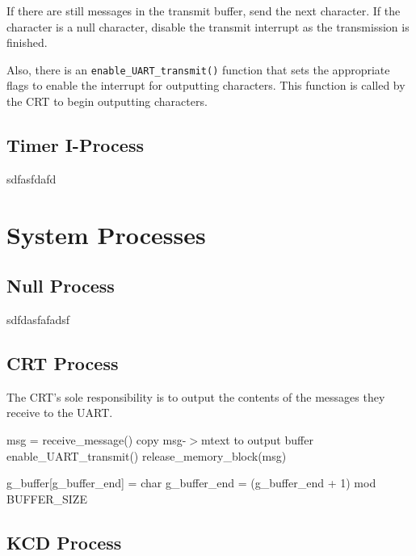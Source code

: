 \documentclass[12pt]{report}
\begin{document}
If there are still messages in the transmit buffer, send the next character. If the character is a null character, disable the transmit interrupt as the transmission is finished.


Also, there is an \texttt{enable_UART_transmit()} function that sets the appropriate flags to enable the interrupt for outputting characters. This function is called by the CRT to begin outputting characters.


\subsection{Timer I-Process}

sdfasfdafd


\section{System Processes}

\subsection{Null Process}

sdfdasfafadsf

\subsection{CRT Process}

The CRT's sole responsibility is to output the contents of the messages they receive to the UART.

\begin{algorithmic}[1]
      \State msg = receive\_message()
      \State copy msg-$>$mtext to output buffer
      \State enable\_UART\_transmit()
      \State release\_memory\_block(msg)
    \EndWhile
  \EndFunction
\end{algorithmic}

\begin{algorithmic}[1]
      \State g_buffer[g_buffer_end] = char
      \State g_buffer_end = (g_buffer_end + 1) mod BUFFER_SIZE
    \EndFor
  \EndFunction
\end{algorithmic}

\subsection{KCD Process}
\end{document}
